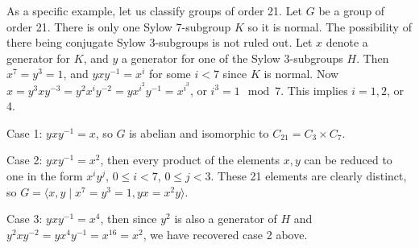 \documentclass[12pt]{article}
\newcommand{\inn}[1]{\langle#1\rangle}
\begin{document}
As a specific example, let us classify groups of order 21. Let $G$ be a group of order 21. There is only one Sylow 7-subgroup $K$ so it is normal. The possibility of there being conjugate Sylow 3-subgroups is not ruled out. Let $x$ denote a generator for $K$, and $y$ a generator for one of the Sylow 3-subgroups $H$. Then $x^7=y^3=1$, and $yxy^{-1}=x^i$ for some $i<7$ since $K$ is normal. Now $x=y^3 x y^{-3}=y^2 x^i y^{-2}= y x^{i^2} y^{-1}=x^{i^3}$, or $i^3=1 \mod 7$. This implies $i=1,2$, or 4.

Case 1: $yxy^{-1}=x$, so $G$ is abelian and isomorphic to
$C_{21}=C_3 \times C_7$.

Case 2: $yxy^{-1}=x^2$, then every product of the elements $x,y$
can be reduced to one in the form $x^i y^j$, $0 \leq i <7$, $0
\leq j <3$. These 21 elements are clearly distinct, so $G=\inn{x,y
\mid x^7=y^3=1, yx=x^2y}$.

Case 3: $yxy^{-1}=x^4$, then since $y^2$ is also a generator of
$H$ and $y^2 x y^{-2}=y x^4 y^{-1}=x^{16}=x^2$, we have recovered
case 2 above.
\end{document}

